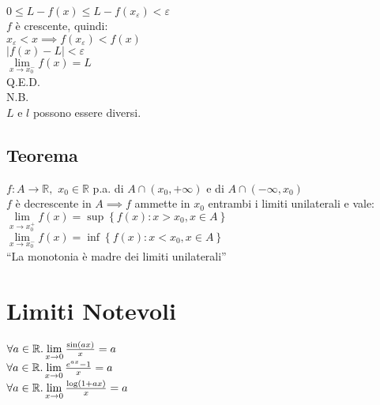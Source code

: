 \documentclass[a4paper, twoside, italian, 11pt]{book}
\newcommand{\braces}[1] {\left \{ #1 \right \}}
\newcommand{\abs}[1] {\left | #1 \right |}
\newcommand{\R}{\mathbb{R}}
\begin{document}
$0 \leq L - f(x) \leq L - f(x_\varepsilon) < \varepsilon$ \\

\noindent
$f$ è crescente, quindi: \\

$x_\varepsilon < x \implies f(x_\varepsilon) < f(x)$ \\

$\abs{f(x) - L} < \varepsilon$ \\

$\lim\limits_{x \to x_0^-} f(x) = L$ \\

\noindent
Q.E.D. \\

\noindent
N.B. \\
$L$ e $l$ possono essere diversi.


\subsection{Teorema}

\noindent
$f : A \rightarrow \R,$ $x_0 \in \R$ p.a. di $A \cap (x_0, +\infty)$ e di $A \cap (-\infty, x_0)$ \\

\noindent
$f$ è decrescente in $A \implies f$ ammette in $x_0$ entrambi i limiti unilaterali e vale: \\

$\lim\limits_{x \to x_0^+} f(x) = \sup \braces{f(x) : x > x_0, x \in A}$ \\

$\lim\limits_{x \to x_0^-} f(x) = \inf \braces{f(x) : x < x_0, x \in A}$ \\

\noindent
``La monotonia è madre dei limiti unilaterali''



\section{Limiti Notevoli}

\noindent
$\forall a \in \R \ldotp \lim\limits_{x \to 0} \frac{\sin(ax)}{x} = a$ \\

\noindent
$\forall a \in \R \ldotp \lim\limits_{x \to 0} \frac{e^{ax} - 1}{x} = a$ \\

\noindent
$\forall a \in \R \ldotp \lim\limits_{x \to 0} \frac{\log(1+ax)}{x} = a$ \\
\end{document}
